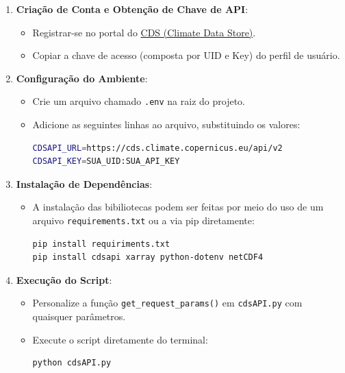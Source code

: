 \documentclass[12pt, a4paper]{article}
\begin{document}
\begin{enumerate}
    \item \textbf{Criação de Conta e Obtenção de Chave de API}:
    \begin{itemize}
        \item Registrar-se no portal do \href{https://cds.climate.copernicus.eu}{CDS (Climate Data Store)}.
        \item Copiar a chave de acesso (composta por UID e Key) do perfil de usuário.
    \end{itemize}

    \item \textbf{Configuração do Ambiente}:
    \begin{itemize}
        \item Crie um arquivo chamado \texttt{.env} na raiz do projeto.
        \item Adicione as seguintes linhas ao arquivo, substituindo os valores:
        \begin{lstlisting}[language=bash]
CDSAPI_URL=https://cds.climate.copernicus.eu/api/v2
CDSAPI_KEY=SUA_UID:SUA_API_KEY
        \end{lstlisting}
    \end{itemize}
    
    \item \textbf{Instalação de Dependências}:
    \begin{itemize}
        \item A instalação das bibiliotecas podem ser feitas por meio do uso de um arquivo \texttt{requirements.txt} ou a via pip diretamente:
        \begin{lstlisting}[language=bash]
pip install requiriments.txt
pip install cdsapi xarray python-dotenv netCDF4
        \end{lstlisting}
    \end{itemize}
    
    \item \textbf{Execução do Script}:
    \begin{itemize}
        \item Personalize a função \texttt{get\_request\_params()} em \texttt{cdsAPI.py} com quaisquer parâmetros.
        \item Execute o script diretamente do terminal:
        \begin{lstlisting}[language=bash]
python cdsAPI.py
        \end{lstlisting}
    \end{itemize}
\end{enumerate}
\end{document}
